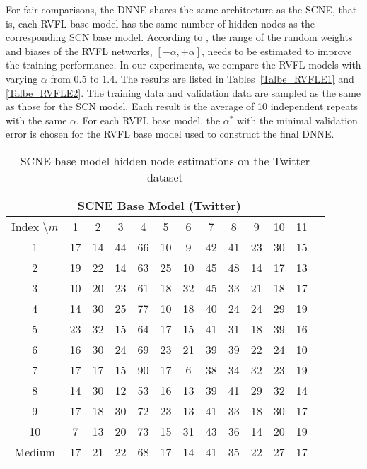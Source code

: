 \documentclass{article}
\begin{document}
For fair comparisons, the DNNE shares the same architecture as the SCNE, that is, each RVFL base model has the same number of hidden nodes as the corresponding SCN base model.
According to \cite{li2017insights}, the range of the random weights and biases of the RVFL networks, $[-\alpha, +\alpha]$, needs to be estimated to improve the training performance. 
In our experiments, we compare the RVFL models with varying $\alpha$ from $0.5$ to $1.4$.
The results are listed in Tables~\ref{Talbe_RVFLE1} and \ref{Talbe_RVFLE2}. 
The training data and validation data are sampled as the same as those for the SCN model.
Each result is the average of 10 independent repeats with the same $\alpha$.
For each RVFL base model, the $\alpha^*$ with the minimal validation error is chosen for the RVFL base model used to construct the final DNNE. 
\begin{table}[H]
\footnotesize 
\centering
\caption{SCNE base model hidden node estimations on the Twitter dataset}
\label{Table_SCNE1}
\begin{tabular}{c|cccccccccccc}\hline
\multicolumn{12}{c}{SCNE Base Model (Twitter)} \\\hline
\multicolumn{1}{c|}{Index $\setminus m$} & \multicolumn{1}{c}{1} & \multicolumn{1}{c}{2} & \multicolumn{1}{c}{3} & \multicolumn{1}{c}{4} & \multicolumn{1}{c}{5} & \multicolumn{1}{c}{6} & \multicolumn{1}{c}{7} & \multicolumn{1}{c}{8} & \multicolumn{1}{c}{9} & \multicolumn{1}{c}{10} & \multicolumn{1}{c}{11} \\ \hline
1       & 17   & 14 & 44   & 66   & 10 & 9  & 42 & 41 & 23   & 30   & 15   \\
2       & 19   & 22 & 14   & 63   & 25 & 10 & 45 & 48 & 14   & 17   & 13   \\
3       & 10   & 20 & 23   & 61   & 18 & 32 & 45 & 33 & 21   & 18   & 17   \\
4       & 14   & 30 & 25   & 77   & 10 & 18 & 40 & 24 & 24   & 29   & 19   \\
5       & 23   & 32 & 15   & 64   & 17 & 15 & 41 & 31 & 18   & 39   & 16   \\
6       & 16   & 30 & 24   & 69   & 23 & 21 & 39 & 39 & 22   & 24   & 10   \\
7       & 17   & 17 & 15   & 90   & 17 & 6  & 38 & 34 & 32   & 23   & 19   \\
8       & 14   & 30 & 12   & 53   & 16 & 13 & 39 & 41 & 29   & 32   & 14   \\
9       & 17   & 18 & 30   & 72   & 23 & 13 & 41 & 33 & 18   & 30   & 17   \\
10      & 7    & 13 & 20   & 73   & 15 & 31 & 43 & 36 & 14   & 20   & 19   \\ \hline
Medium  & 17 & 21 & 22 & 68 & 17 & 14 & 41 & 35 & 22 & 27 & 17 \\\hline
\end{tabular}
\end{table}
\end{document}
